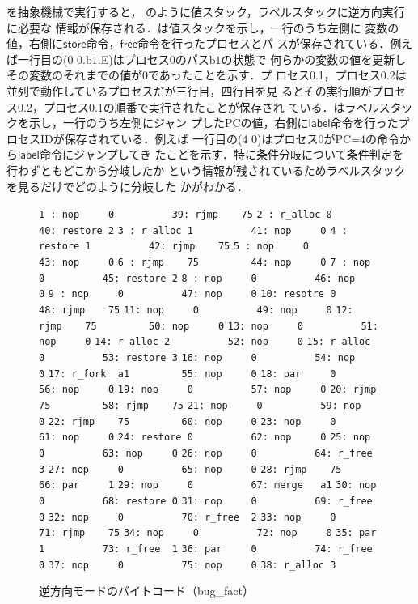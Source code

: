 \documentclass[submit,PRO]{ipsj}
\newcommand{\bcode}[1]{$\mathsf{#1}$}
\newcommand{\blabel}[1]{\mathrm{b}#1}
\def\|{\verb|}
\begin{document}
を抽象機械で実行すると，
のように値スタック，ラベルスタックに逆方向実行に必要な
情報が保存される．は値スタックを示し，一行のうち左側に
変数の値，右側に\bcode{store}命令，\bcode{free}命令を行ったプロセスとパ
スが保存されている．例えば一行目の(0 0.$\blabel{1}$.E)はプロセス0のパス$\blabel{1}$の状態で
何らかの変数の値を更新しその変数のそれまでの値が0であったことを示す．プ
ロセス0.1，プロセス0.2は並列で動作しているプロセスだが三行目，四行目を見
るとその実行順がプロセス0.2，プロセス0.1の順番で実行されたことが保存され
ている．はラベルスタックを示し，一行のうち左側にジャン
プしたPCの値，右側に\bcode{label}命令を行ったプロセスIDが保存されている．例えば
一行目の(4 0)はプロセス0がPC=4の命令から\bcode{label}命令にジャンプしてき
たことを示す．特に条件分岐について条件判定を行わずともどこから分岐したか
という情報が残されているためラベルスタックを見るだけでどのように分岐した
かがわかる．

\begin{figure}[tb]
\vbox{
\hbox{\|1 : nop     0          39: rjmp    75|}
\hbox{\|2 : r_alloc 0          40: restore 2|}
\hbox{\|3 : r_alloc 1          41: nop     0|}
\hbox{\|4 : restore 1          42: rjmp    75|}
\hbox{\|5 : nop     0          43: nop     0|}
\hbox{\|6 : rjmp    75         44: nop     0|}
\hbox{\|7 : nop     0          45: restore 2|}
\hbox{\|8 : nop     0          46: nop     0|}
\hbox{\|9 : nop     0          47: nop     0|}
\hbox{\|10: resotre 0          48: rjmp    75|}
\hbox{\|11: nop     0          49: nop     0|}
\hbox{\|12: rjmp    75         50: nop     0|}
\hbox{\|13: nop     0          51: nop     0|}
\hbox{\|14: r_alloc 2          52: nop     0|}
\hbox{\|15: r_alloc 0          53: restore 3|}
\hbox{\|16: nop     0          54: nop     0|}
\hbox{\|17: r_fork  a1         55: nop     0|}
\hbox{\|18: par     0          56: nop     0|}
\hbox{\|19: nop     0          57: nop     0|}
\hbox{\|20: rjmp    75         58: rjmp    75|}
\hbox{\|21: nop     0          59: nop     0|}
\hbox{\|22: rjmp    75         60: nop     0|}
\hbox{\|23: nop     0          61: nop     0|}
\hbox{\|24: restore 0          62: nop     0|}
\hbox{\|25: nop     0          63: nop     0|}
\hbox{\|26: nop     0          64: r_free  3|}
\hbox{\|27: nop     0          65: nop     0|}
\hbox{\|28: rjmp    75         66: par     1|}
\hbox{\|29: nop     0          67: merge   a1|}
\hbox{\|30: nop     0          68: restore 0|}
\hbox{\|31: nop     0          69: r_free  0|}
\hbox{\|32: nop     0          70: r_free  2|}
\hbox{\|33: nop     0          71: rjmp    75|}
\hbox{\|34: nop     0          72: nop     0|}
\hbox{\|35: par     1          73: r_free  1|}
\hbox{\|36: par     0          74: r_free  0|}
\hbox{\|37: nop     0          75: nop     0|}
\hbox{\|38: r_alloc 3         |}
}
\centerline{}
\caption{逆方向モードのバイトコード（bug\_fact）} %
\label{fig:backwardfact}
\end{figure}
\end{document}
